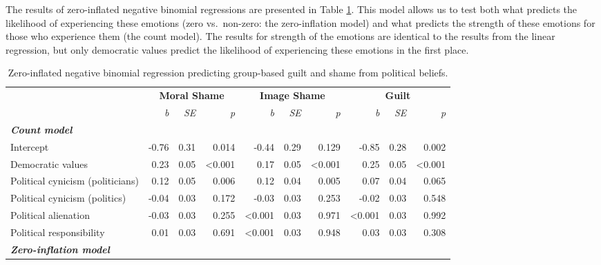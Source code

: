 \documentclass[
]{article}
\begin{document}
The results of zero-inflated negative binomial regressions are presented in Table \ref{tab:TableS2}. This model allows us to test both what predicts the likelihood of experiencing these emotions (zero vs.~non-zero: the zero-inflation model) and what predicts the strength of these emotions for those who experience them (the count model). The results for strength of the emotions are identical to the results from the linear regression, but only democratic values predict the likelihood of experiencing these emotions in the first place.

\begin{table}[H]

\caption{\label{tab:TableS2}Zero-inflated negative binomial regression predicting group-based guilt and shame from political beliefs.}
\centering
\fontsize{8}{10}\selectfont
\begin{tabular}[t]{lrrrrrrrrr}
\toprule
\multicolumn{1}{c}{\textbf{}} & \multicolumn{3}{c}{\textbf{Moral Shame}} & \multicolumn{3}{c}{\textbf{Image Shame}} & \multicolumn{3}{c}{\textbf{Guilt}} \\
\cmidrule(l{3pt}r{3pt}){2-4} \cmidrule(l{3pt}r{3pt}){5-7} \cmidrule(l{3pt}r{3pt}){8-10}
\em{ } & \em{b} & \em{SE} & \em{p} & \em{b} & \em{SE} & \em{p} & \em{b} & \em{SE} & \em{p}\\
\midrule
\em{\textbf{Count model}} & \em{\textbf{}} & \em{\textbf{}} & \em{\textbf{}} & \em{\textbf{}} & \em{\textbf{}} & \em{\textbf{}} & \em{\textbf{}} & \em{\textbf{}} & \em{\textbf{}}\\
\midrule
Intercept & -0.76 & 0.31 & 0.014 & -0.44 & 0.29 & 0.129 & -0.85 & 0.28 & 0.002\\
Democratic values & 0.23 & 0.05 & <0.001 & 0.17 & 0.05 & <0.001 & 0.25 & 0.05 & <0.001\\
Political cynicism (politicians) & 0.12 & 0.05 & 0.006 & 0.12 & 0.04 & 0.005 & 0.07 & 0.04 & 0.065\\
Political cynicism (politics) & -0.04 & 0.03 & 0.172 & -0.03 & 0.03 & 0.253 & -0.02 & 0.03 & 0.548\\
\addlinespace
Political alienation & -0.03 & 0.03 & 0.255 & <0.001 & 0.03 & 0.971 & <0.001 & 0.03 & 0.992\\
Political responsibility & 0.01 & 0.03 & 0.691 & <0.001 & 0.03 & 0.948 & 0.03 & 0.03 & 0.308\\
\midrule
\em{\textbf{Zero-inflation model}} & \em{\textbf{}} & \em{\textbf{}} & \em{\textbf{}} & \em{\textbf{}} & \em{\textbf{}} & \em{\textbf{}} & \em{\textbf{}} & \em{\textbf{}} & \em{\textbf{}}\\

\end{tabular}
\end{table}
\end{document}
